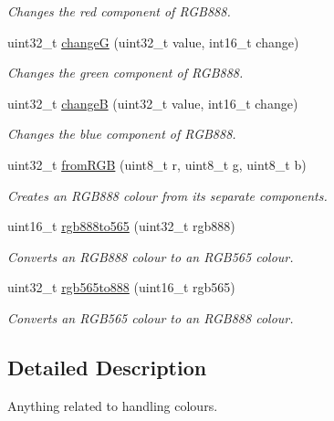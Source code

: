 \begin{DoxyCompactItemize}
\begin{DoxyCompactList}\small\item\em Changes the red component of R\+G\+B888. \end{DoxyCompactList}\item 
uint32\+\_\+t \hyperlink{namespaceColour_a944d058dabcf1f24a5093a04656efc60}{changeG} (uint32\+\_\+t value, int16\+\_\+t change)
\begin{DoxyCompactList}\small\item\em Changes the green component of R\+G\+B888. \end{DoxyCompactList}\item 
uint32\+\_\+t \hyperlink{namespaceColour_a8e854e6a656f9d7c53dbd46eccba1816}{changeB} (uint32\+\_\+t value, int16\+\_\+t change)
\begin{DoxyCompactList}\small\item\em Changes the blue component of R\+G\+B888. \end{DoxyCompactList}\item 
uint32\+\_\+t \hyperlink{namespaceColour_a2ee4192ca3c1535351e57f223e5fb65d}{from\+R\+GB} (uint8\+\_\+t r, uint8\+\_\+t g, uint8\+\_\+t b)
\begin{DoxyCompactList}\small\item\em Creates an R\+G\+B888 colour from its separate components. \end{DoxyCompactList}\item 
uint16\+\_\+t \hyperlink{namespaceColour_a5311fafb2011e62db5d600badee72ee9}{rgb888to565} (uint32\+\_\+t rgb888)
\begin{DoxyCompactList}\small\item\em Converts an R\+G\+B888 colour to an R\+G\+B565 colour. \end{DoxyCompactList}\item 
uint32\+\_\+t \hyperlink{namespaceColour_aa7b3de65f5d56d88b13863de9aa5641a}{rgb565to888} (uint16\+\_\+t rgb565)
\begin{DoxyCompactList}\small\item\em Converts an R\+G\+B565 colour to an R\+G\+B888 colour. \end{DoxyCompactList}\end{DoxyCompactItemize}


\subsection{Detailed Description}
Anything related to handling colours. 

